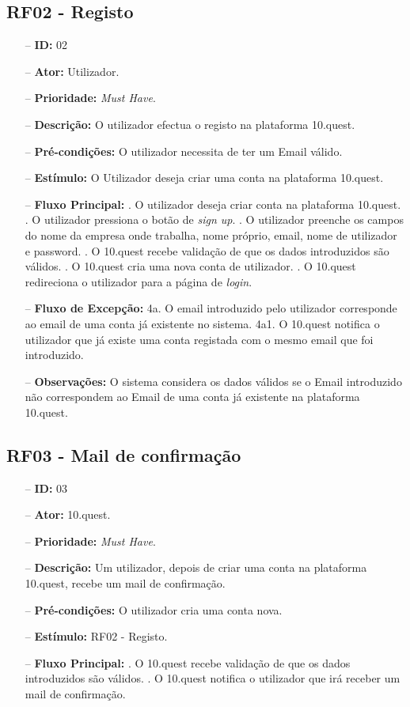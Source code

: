 \subsection{RF02 - Registo}
\begin{itemize}
	\item[--] \textbf{ID:} 02
	\item[--]  \textbf{Ator:} Utilizador.
	\item[--]  \textbf{Prioridade:} \textit{Must Have}.
	\item[--]  \textbf{Descrição:} O utilizador efectua o registo na plataforma 10.quest.
	\item[--]  \textbf{Pré-condições:} O utilizador necessita de ter um Email válido.
	\item[--]  \textbf{Estímulo:} O Utilizador deseja criar uma conta na plataforma 10.quest.
	\item[--]  \textbf{Fluxo Principal:} 
		. O utilizador deseja criar conta na plataforma 10.quest.
		. O utilizador pressiona o botão de \textit{sign up}.
		. O utilizador preenche os campos do nome da empresa onde trabalha, nome próprio, email, nome de utilizador e password.
		. O 10.quest recebe validação de que os dados introduzidos são válidos.
		. O 10.quest cria uma nova conta de utilizador.
		. O 10.quest redireciona o utilizador para a página de \textit{login}.
	\item[--]  \textbf{Fluxo de Excepção:} 
			\subitem 4a. O email introduzido pelo utilizador corresponde ao email de uma conta já existente no sistema.
			\subitem 4a1. O 10.quest notifica o utilizador que já existe uma conta registada com o mesmo email que foi introduzido.
	\item[--]  \textbf{Observações:} 
		\subitem O sistema considera os dados válidos se o Email introduzido não correspondem ao Email de uma conta já existente na plataforma 10.quest.
\end{itemize}
\newpage

\subsection{RF03 - Mail de confirmação}
\begin{itemize}
	\item[--] \textbf{ID:} 03
	\item[--]  \textbf{Ator:} 10.quest.
	\item[--]  \textbf{Prioridade:} \textit{Must Have}.
	\item[--]  \textbf{Descrição:} Um utilizador, depois de criar uma conta na plataforma 10.quest, recebe um mail de confirmação.
	\item[--]  \textbf{Pré-condições:} O utilizador cria uma conta nova.
	\item[--]  \textbf{Estímulo:} RF02 - Registo.
	\item[--]  \textbf{Fluxo Principal:} 
			. O 10.quest recebe validação de que os dados introduzidos são válidos.
			. O 10.quest notifica o utilizador que irá receber um mail de confirmação.
\end{itemize}
\newpage


